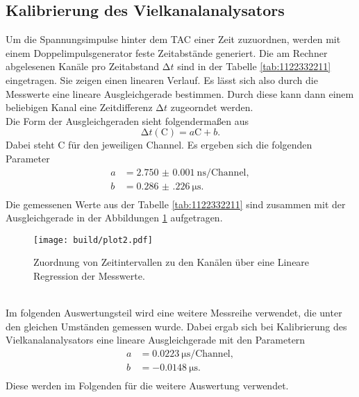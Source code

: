 \subsection{Kalibrierung des Vielkanalanalysators}
Um die Spannungsimpulse hinter dem TAC einer Zeit zuzuordnen, werden mit einem Doppelimpulsgenerator feste Zeitabstände generiert. Die am Rechner abgelesenen Kanäle pro Zeitabstand $\increment t$
sind in der Tabelle \ref{tab:1122332211} eingetragen. Sie zeigen einen linearen Verlauf. Es lässt sich also durch die Messwerte eine lineare Ausgleichgerade bestimmen. Durch diese kann dann einem
beliebigen Kanal eine Zeitdifferenz $\increment t$ zugeorndet werden.
\\
Die Form der Ausgleichgeraden sieht folgendermaßen aus
\begin{equation}
\increment t (\text{C}) = a  \text{C} + b.
\end{equation}
Dabei steht $\text{C}$ für den jeweiligen Channel. 
Es ergeben sich die folgenden Parameter
\begin{align*}
    a &= \SI{2.750(1)}{\nano\second\per{\text{Channel}}},\\
    b &= \SI{0.286(226)}{\micro\second}.\\
\end{align*}
Die gemessenen Werte aus der Tabelle \ref{tab:1122332211} sind zusammen mit der Ausgleichgerade in der Abbildungen \ref{fig:333} aufgetragen.
\begin{figure}
    \centering
    \texttt{[image: build/plot2.pdf]}
    \caption{Zuordnung von Zeitintervallen zu den Kanälen über eine Lineare Regression der Messwerte.} 
    \label{fig:333}
\end{figure}
\\
\newline
Im folgenden Auswertungsteil wird eine weitere Messreihe verwendet, die unter den gleichen Umständen gemessen wurde. Dabei ergab sich bei Kalibrierung des Vielkanalanalysators eine lineare 
Ausgleichgerade mit den Parametern
\begin{align*}
    a &= \SI{0.0223}{\micro\second\per{\text{Channel}}},\\
    b &= \SI{-0.0148}{\micro\second}.\\
\end{align*}
Diese werden im Folgenden für die weitere Auswertung verwendet.

